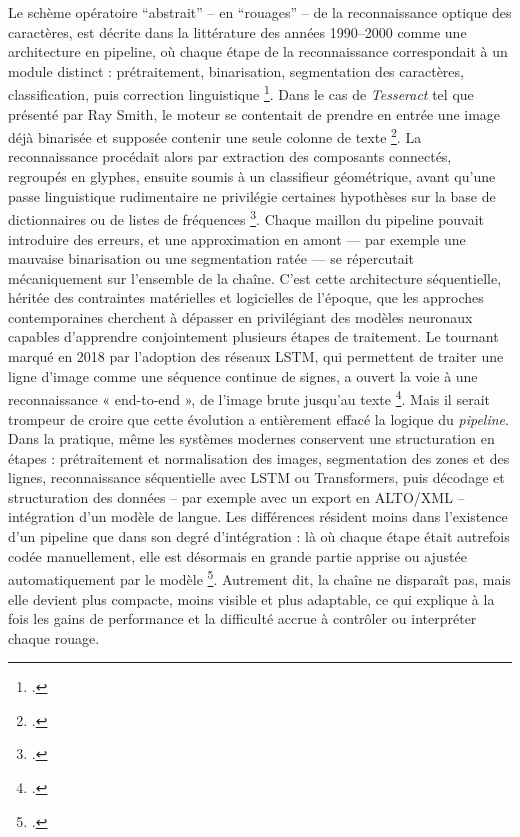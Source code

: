 Le schème opératoire \enquote{abstrait} -- en \enquote{rouages} -- de la reconnaissance optique des caractères, est décrite dans la littérature des années 1990–2000 comme une architecture en pipeline, où chaque étape de la reconnaissance correspondait à un module distinct : prétraitement, binarisation, segmentation des caractères, classification, puis correction linguistique \footcite[][]{lecolinet}. Dans le cas de \emph{Tesseract} tel que présenté par Ray Smith, le moteur se contentait de prendre en entrée une image déjà binarisée et supposée contenir une seule colonne de texte \footcite[][]{smith}. La reconnaissance procédait alors par extraction des composants connectés, regroupés en glyphes, ensuite soumis à un classifieur géométrique, avant qu’une passe linguistique rudimentaire ne privilégie certaines hypothèses sur la base de dictionnaires ou de listes de fréquences \footcite[][]{smith2013}. Chaque maillon du pipeline pouvait introduire des erreurs, et une approximation en amont — par exemple une mauvaise binarisation ou une segmentation ratée — se répercutait mécaniquement sur l’ensemble de la chaîne. C’est cette architecture séquentielle, héritée des contraintes matérielles et logicielles de l’époque, que les approches contemporaines cherchent à dépasser en privilégiant des modèles neuronaux capables d’apprendre conjointement plusieurs étapes de traitement. Le tournant marqué en 2018 par l’adoption des réseaux LSTM, qui permettent de traiter une ligne d’image comme une séquence continue de signes, a ouvert la voie à une reconnaissance « end-to-end », de l’image brute jusqu’au texte \footcite[][]{smith}. Mais il serait trompeur de croire que cette évolution a entièrement effacé la logique du \emph{pipeline}. Dans la pratique, même les systèmes modernes conservent une structuration en étapes : prétraitement et normalisation des images, segmentation des zones et des lignes, reconnaissance séquentielle avec LSTM ou Transformers, puis décodage et structuration des données -- par exemple avec un export en ALTO/XML -- intégration d’un modèle de langue. Les différences résident moins dans l’existence d’un pipeline que dans son degré d’intégration : là où chaque étape était autrefois codée manuellement, elle est désormais en grande partie apprise ou ajustée automatiquement par le modèle \footcite[][]{pipeline-kraken}. Autrement dit, la chaîne ne disparaît pas, mais elle devient plus compacte, moins visible et plus adaptable, ce qui explique à la fois les gains de performance et la difficulté accrue à contrôler ou interpréter chaque rouage.

